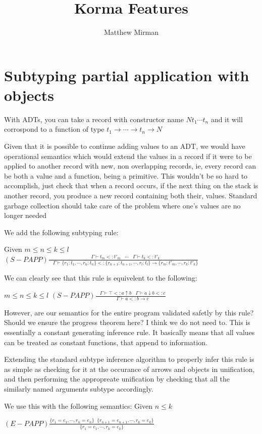 \documentclass[english]{article}
\newcommand{\judges}{ \; \; \; \Gamma \vdash}
\begin{document}
\title{Korma Features} \author{Matthew Mirman}
\maketitle

\part*{Subtyping partial application with objects}


With ADTs, you can take a record with constructor name $N t_1 \cdots  t_n$
and it will corrospond to a function of type $t_1 \rightarrow \cdots \rightarrow t_n \rightarrow N$


Given that it is possible to continue adding values to an ADT, we would have operational semantics which would extend the values in a record if it were to be applied to another record with new, non overlapping records, ie, every record can be both a value and a function, being a primitive.  This wouldn't be so hard to accomplish, just check that when a record occurs, if the next thing on the stack is another record, you produce a new record containing both their, values. Standard garbage collection should take care of the problem where one's values are no longer needed

We add the following subtyping rule: 

Given $m \leq n \leq k \leq l$
$(S-PAPP)\frac{
   \judges t_m <: t'_m 
   \;\;\;\cdots
   \judges t_k <: t'_k  
}{
   \judges \{ r_1:t_1, \cdots , r_n:t_n\}     <:     \{ r_{n+1}:t_{n+1}, \cdots , r_{l}:t_{l} \} \rightarrow \{ r_m:t'_m, \cdots , r_{k}:t'_{k} \}
}$ 

We can clearly see that this rule is equivelent to the following:

$m \leq n \leq k \leq l$
$(S-PAPP)\frac{
   \judges \top  <: a \uparrow b
   \judges a \downarrow b <: c
}{
   \judges a  <: b  \rightarrow c
}$ 

However, are our semantics for the entire program validated safetly by this rule?  Should we ensure the progress theorem here?
I think we do not need to.  This is essentially a constant generating inference rule.  It basically means that all values can be treated
as constant functions, that append to information.


Extending the standard subtype inference algorithm to properly infer this rule is as simple as checking for it at the occurance of arrows and objects in unification,
and then performing the appropreate unification by checking that all the similarly named arguments subtype accordingly.

We use this with the following semantics: Given $n \leq k$

$(E-PAPP)\frac{
  \{ r_1=e_1, \cdots , r_n=e_n \} \;\; \{ r_{n+1}=e_{n+1}, \cdots , r_k=e_k\}
}{
  \{ r_1=e_1, \cdots , r_k=e_k\}
}$
\end{document}

